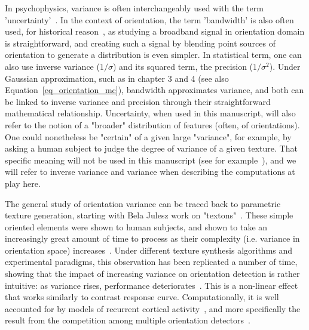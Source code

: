 In psychophysics, variance is often interchangeably used with the term 'uncertainty'~\cite{szeliski1990bayesian}. In the context of orientation, the term 'bandwidth' is also often used, for historical reason~\cite{snowden1992orientation}, as studying a broadband signal in orientation domain is straightforward, and creating such a signal by blending point sources of orientation to generate a distribution is even simpler. In statistical term, one can also use inverse variance ($1/\sigma$) and its squared term, the precision ($1/\sigma^2$). Under Gaussian approximation, such as in chapter 3 and 4 (see also Equation~\ref{eq_orientation_mc}), bandwidth approximates variance, and both can be linked to inverse variance and precision through their straightforward mathematical relationship. Uncertainty, when used in this manuscript, will also refer to the notion of a "broader" distribution of features (often, of orientations). One could nonetheless be "certain" of a given large "variance", for example, by asking a human subject to judge the degree of variance of a given texture. That specific meaning will not be used in this manuscript (see for example~\cite{barthelme2009evaluation,geurts2021reported,sanchez2023action}), and we will refer to inverse variance and variance when describing the computations at play here.

The general study of orientation variance can be traced back to parametric texture generation, starting with Bela Julesz work on "textons"~\cite{julesz1981textons}. These simple oriented elements were shown to human subjects, and shown to take an increasingly great amount of time to process as their complexity (i.e. variance in orientation space) increases~\cite{julesz1983human}.
Under different texture synthesis algorithms and experimental paradigms, this observation has been replicated a number of time, showing that the impact of increasing variance on orientation detection is rather intuitive: as variance rises, performance deteriorates~\cite{phillips1984orientation,heeley1989width,heeley1998influence}. This is a non-linear effect~\cite{heeley1998influence} that works similarly to contrast response curve. Computationally, it is well accounted for by models of recurrent cortical activity~\cite{keeble1995detection,beaudot2006orientation}, and more specifically the result from the competition among multiple orientation detectors~\cite{ringach2002orientation}.

